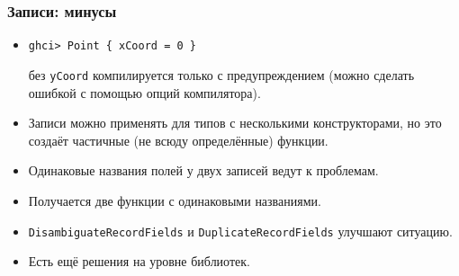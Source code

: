 \documentclass[10pt]{beamer}
\begin{document}
\begin{frame}[fragile]
  \frametitle{Записи: минусы}\hypertarget{rec2}{}
  \hyperlink{rec1}{}
  \begin{itemize}
    \item
          \begin{lstlisting}
ghci> Point { xCoord = 0 }
\end{lstlisting}
          \pause
          без \lstinline|yCoord| компилируется только с предупреждением (можно сделать ошибкой с помощью опций компилятора).
          \pause
    \item Записи можно применять для типов с несколькими конструкторами, но это создаёт частичные (не всюду определённые) функции.
          \pause
    \item Одинаковые названия полей у двух записей ведут к проблемам.
          \pause
    \item Получается две функции с одинаковыми названиями.
    \item \lstinline|DisambiguateRecordFields| и \lstinline|DuplicateRecordFields| улучшают ситуацию.
          \pause
    \item Есть ещё решения на уровне библиотек.
  \end{itemize}
\end{frame}
\end{document}
